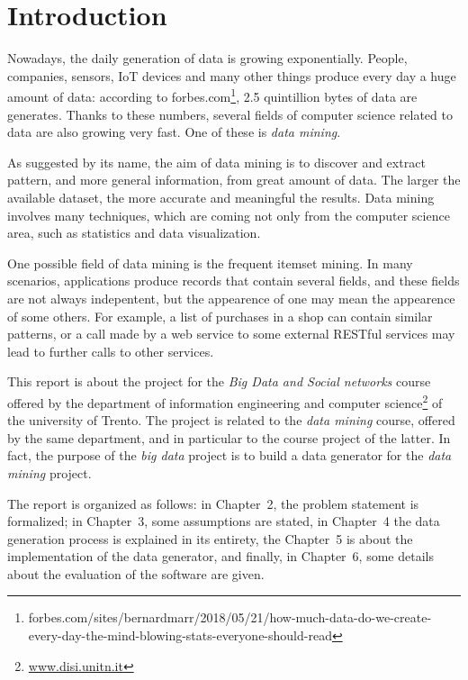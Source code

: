 \documentclass{acm_proc_article-sp-sigmod09}
\begin{document}


\section{Introduction}
Nowadays, the daily generation of data is growing exponentially. People, companies, sensors, IoT devices and many other things produce every day a huge amount of data: according to forbes.com\footnote{forbes.com/sites/bernardmarr/2018/05/21/how-much-data-do-we-create-every-day-the-mind-blowing-stats-everyone-should-read}, 2.5 quintillion bytes of data are generates. Thanks to these numbers, several fields of computer science related to data are also growing very fast. One of these is \emph{data mining}.

As suggested by its name, the aim of data mining is to discover and extract pattern, and more general information, from great amount of data. The larger the available dataset, the more accurate and meaningful the results. Data mining involves many techniques, which are coming not only from the computer science area, such as statistics and data visualization. 

One possible field of data mining is the frequent itemset mining. In many scenarios, applications produce records that contain several fields, and these fields are not always indepentent, but the appearence of one may mean the appearence of some others. For example, a list of purchases in a shop can contain similar patterns, or a call made by a web service to some external RESTful services may lead to further calls to other services.

This report is about the project for the \emph{Big Data and Social networks} course offered by the department of information engineering and computer science\footnote{\url{www.disi.unitn.it}} of the university of Trento. The project is related to the \emph{data mining} course, offered by the same department, and in particular to the course project of the latter. In fact, the purpose of the \emph{big data} project is to build a data generator for the \emph{data mining} project.

The report is organized as follows: in Chapter~2, the problem statement is formalized; in Chapter~3, some assumptions are stated, in Chapter~4 the data generation process is explained in its entirety, the Chapter~5 is about the implementation of the data generator, and finally, in Chapter~6, some details about the evaluation of the software are given.
\end{document}
